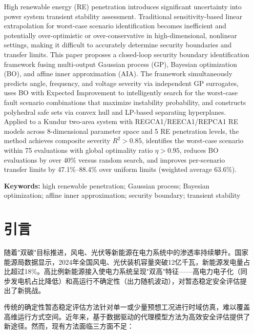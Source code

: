 \documentclass[a4paper,11pt]{ctexart}
\begin{document}
\begin{enabstract}
High renewable energy (RE) penetration introduces significant uncertainty into power system transient stability assessment. Traditional sensitivity-based linear extrapolation for worst-case scenario identification becomes inefficient and potentially over-optimistic or over-conservative in high-dimensional, nonlinear settings, making it difficult to accurately determine security boundaries and transfer limits. This paper proposes a closed-loop security boundary identification framework fusing multi-output Gaussian process (GP), Bayesian optimization (BO), and affine inner approximation (AIA). The framework simultaneously predicts angle, frequency, and voltage severity via independent GP surrogates, uses BO with Expected Improvement to intelligently search for the worst-case fault scenario combinations that maximize instability probability, and constructs polyhedral safe sets via convex hull and LP-based separating hyperplanes. Applied to a Kundur two-area system with REGCA1/REECA1/REPCA1 RE models across 8-dimensional parameter space and 5 RE penetration levels, the method achieves composite severity $R^2 > 0.85$, identifies the worst-case scenario within 75 evaluations with global optimality ratio $\eta > 0.95$, reduces BO evaluations by over 40\% versus random search, and improves per-scenario transfer limits by 47.1\%--88.4\% over uniform limits (weighted average 63.6\%).

\medskip
\textbf{Keywords:} high renewable penetration; Gaussian process; Bayesian optimization; affine inner approximation; security boundary; transient stability
\end{enabstract}

\section{引言}
\label{sec:intro}

随着"双碳"目标推进，风电、光伏等新能源在电力系统中的渗透率持续攀升。国家能源局数据显示，2024年全国风电、光伏装机容量突破12亿千瓦，新能源发电量占比超过18\%。高比例新能源接入使电力系统呈现"双高"特征——高电力电子化（同步发电机占比降低）和高运行不确定性（出力随机波动），对暂态稳定安全评估提出了新挑战\cite{vittal2022re_stability}。

传统的确定性暂态稳定评估方法针对单一或少量预想工况进行时域仿真，难以覆盖高维运行方式空间。近年来，基于数据驱动的代理模型方法为高效安全评估提供了新途径。然而，现有方法面临三方面不足：
\end{document}
